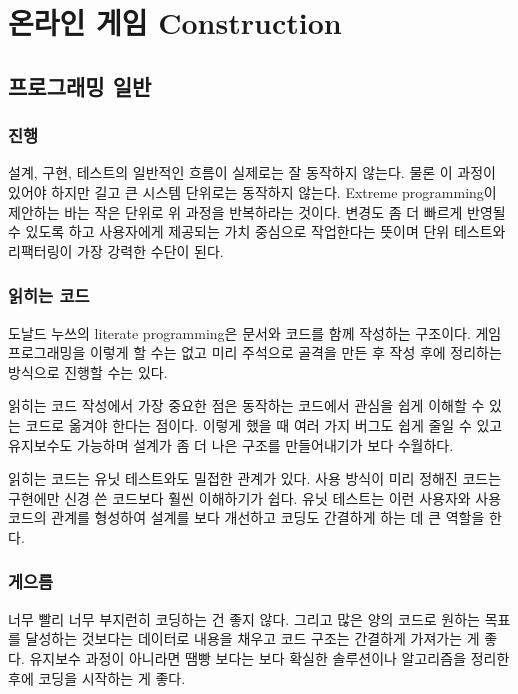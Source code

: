 \documentclass[chapter,kosection, 10.5pt, romanfixed, a4paper]{oblivoir}
\begin{document}
\chapter{온라인 게임 Construction}

\section{프로그래밍 일반}

\subsection{진행}

설계, 구현, 테스트의 일반적인 흐름이 실제로는 잘 동작하지 않는다. 물론 이 과정이 있어야 하지만
길고 큰 시스템 단위로는 동작하지 않는다. Extreme programming이 제안하는 바는 작은 단위로 
위 과정을 반복하라는 것이다. 변경도 좀 더 빠르게 반영될 수 있도록 하고 사용자에게 제공되는 
가치 중심으로 작업한다는 뜻이며 단위 테스트와 리팩터링이 가장 강력한 수단이 된다. 

\subsection{읽히는 코드}

도날드 누쓰의 literate programming은 문서와 코드를 함께 작성하는 구조이다. 게임 프로그래밍을 
이렇게 할 수는 없고 미리 주석으로 골격을 만든 후 작성 후에 정리하는 방식으로 진행할 수는 있다. 

읽히는 코드 작성에서 가장 중요한 점은 동작하는 코드에서 관심을 쉽게 이해할 수 있는 코드로 
옮겨야 한다는 점이다. 이렇게 했을 때 여러 가지 버그도 쉽게 줄일 수 있고 유지보수도 가능하며 
설계가 좀 더 나은 구조를 만들어내기가 보다 수월하다. 

읽히는 코드는 유닛 테스트와도 밀접한 관계가 있다. 사용 방식이 미리 정해진 코드는 구현에만 
신경 쓴 코드보다 훨씬 이해하기가 쉽다. 유닛 테스트는 이런 사용자와 사용 코드의 관계를 형성하여 
설계를 보다 개선하고 코딩도 간결하게 하는 데 큰 역할을 한다. 

\subsection{게으름}

너무 빨리 너무 부지런히 코딩하는 건 좋지 않다. 그리고 많은 양의 코드로 원하는 목표를 달성하는 것보다는
데이터로 내용을 채우고 코드 구조는 간결하게 가져가는 게 좋다. 유지보수 과정이 아니라면 땜빵 보다는
보다 확실한 솔루션이나 알고리즘을 정리한 후에 코딩을 시작하는 게 좋다. 
\end{document}
